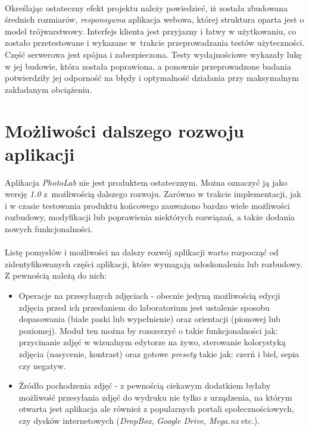 \\
Określając ostateczny efekt projektu należy powiedzieć, iż została zbudowana średnich rozmiarów, \textit{responsywna} aplikacja webowa, której struktura oparta jest o model trójwarstwowy. Interfejs klienta jest przyjazny i łatwy w użytkowaniu, co zostało przetestowane i wykazane w~trakcie przeprowadzania testów użyteczności. Część serwerowa jest spójna i zabezpieczona. Testy wydajnościowe wykazały lukę w jej budowie, która została poprawiona, a ponownie przeprowadzone badania potwierdziły jej odporność na błędy i optymalność działania przy maksymalnym zakładanym obciążeniu.

\section{Możliwości dalszego rozwoju aplikacji}
\quad Aplikacja \textit{PhotoLab} nie jest produktem ostatecznym. Można oznaczyć ją jako wersję \textit{1.0} z~możliwością dalszego rozwoju. Zarówno w trakcie implementacji, jak i w czasie testowania produktu końcowego zauważono bardzo wiele możliwości rozbudowy, modyfikacji lub poprawienia niektórych rozwiązań, a także dodania nowych funkcjonalności. \\
\\
Listę pomysłów i możliwości na dalszy rozwój aplikacji warto rozpocząć od zidentyfikowanych części aplikacji, które wymagają udoskonalenia lub rozbudowy. Z pewnością należą do nich:
\begin{itemize}
    \item Operacje na przesyłanych zdjęciach - obecnie jedyną możliwością edycji zdjęcia przed ich przesłaniem do laboratorium jest ustalenie sposobu dopasowania (białe paski lub wypełnienie) oraz orientacji (pionowej lub poziomej). Moduł ten można by rozszerzyć o takie funkcjonalności jak: przycinanie zdjęć w wizualnym edytorze na żywo, sterowanie kolorystyką zdjęcia (nasycenie, kontrast) oraz gotowe \textit{presety} takie jak: czerń i biel, sepia czy negatyw.
    \item Źródło pochodzenia zdjęć - z pewnością ciekawym dodatkiem byłaby możliwość przesyłania zdjęć do wydruku nie tylko z urządzenia, na którym otwarta jest aplikacja ale również z popularnych portali społecznościowych, czy dysków internetowych (\textit{DropBox}, \textit{Google Drive}, \textit{Mega.nz} etc.).
\end{itemize}

